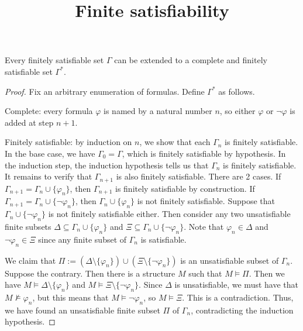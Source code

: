 \documentclass[a4paper]{article}
\title{Finite satisfiability}
\begin{document}
\maketitle

\begin{lemma}
  Every finitely satisfiable set $\Gamma$ can be extended to a complete and finitely satisfiable set $\Gamma^{*}$.
\end{lemma}
\begin{proof}
  Fix an arbitrary enumeration of formulas.
  Define $\Gamma^{*}$ as follows.
  Complete: every formula $\varphi$ is named by a natural number $n$, so either $\varphi$ or $\lnot\varphi$ is added at step $n+1$.

  Finitely satisfiable: by induction on $n$, we show that each $\Gamma_{n}$ is finitely satisfiable.
  In the base case, we have $\Gamma_{0} = \Gamma$, which is finitely satisfiable by hypothesis.
  In the induction step, the induction hypothesis tells us that $\Gamma_{n}$ is finitely satisfiable.
  It remains to verify that $\Gamma_{n+1}$ is also finitely satisfiable.
  There are 2 cases.
  If $\Gamma_{n+1} = \Gamma_{n} \cup \{\varphi_{n}\}$, then $\Gamma_{n+1}$ is finitely satisfiable by construction.
  If $\Gamma_{n+1} = \Gamma_{n} \cup \{\lnot\varphi_{n}\}$, then $\Gamma_{n} \cup \{\varphi_{n}\}$ is not finitely satisfiable.
  Suppose that $\Gamma_{n} \cup \{\lnot\varphi_{n}\}$ is not finitely satisfiable either.
  Then consider any two unsatisfiable finite subsets $\Delta \subseteq  \Gamma_{n} \cup \{\varphi_{n}\}$ and $\Xi \subseteq \Gamma_{n} \cup \{\lnot\varphi_{n}\}$.
  Note that $\varphi_{n} \in \Delta$ and $\lnot\varphi_{n} \in \Xi$ since any finite subset of $\Gamma_{n}$ is satisfiable.

  We claim that $\Pi := (\Delta \setminus \{\varphi_{n}\}) \cup (\Xi \setminus \{\lnot\varphi_{n}\})$ is an unsatisfiable subset of $\Gamma_{n}$.
  Suppose the contrary.
  Then there is a structure $M$ such that $M \vDash \Pi$.
  Then we have $M \vDash \Delta \setminus \{\varphi_{n}\}$ and $M \vDash \Xi \setminus \{\lnot\varphi_{n}\}$.
  Since $\Delta$ is unsatisfiable, we must have that $M \nvDash \varphi_{n}$, but this means that $M \vDash \lnot\varphi_{n}$, so $M \vDash \Xi$.
  This is a contradiction.
  Thus, we have found an unsatisfiable finite subset $\Pi$ of $\Gamma_{n}$, contradicting the induction hypothesis.


\end{proof}
\end{document}
